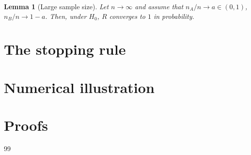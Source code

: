 \documentclass[11pt,a4paper]{article}
\newtheorem{lemma}{Lemma}
\begin{document}
\begin{lemma}[Large sample size]
Let $n \to \infty$ and assume that $n_{A} /n \to a \in (0, 1)$, $n_B/n \to 1 - a$. Then, under $H_0$, $R$ converges to $1$ in probability.
\end{lemma}

\section{The stopping rule}

\section{Numerical illustration}

\section{Proofs}



\begin{thebibliography}{99}

\end{thebibliography}
\end{document}
